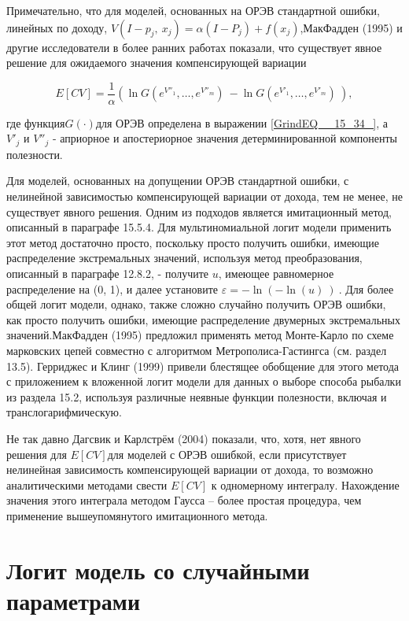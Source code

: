 Примечательно, что для моделей, основанных на ОРЭВ стандартной ошибки, линейных по доходу, $V\left(I-p_j,\ x_j\right)=\alpha \left(I-P_j\right)+f(x_j)$,МакФадден (1995) и другие исследователи в более ранних работах показали, что существует явное решение для ожидаемого значения компенсирующей вариации

\[E\left[CV\right]=\frac{1}{\alpha }\left({\ln  G\left(e^{V''_1},\dots ,e^{V''_m}\right)\ }-{\ln  G\left(e^{V'_1},\dots ,e^{V'_m}\right)\ }\right),\] 

где функция$G(\cdot )$для ОРЭВ определена в выражении \eqref{GrindEQ__15_34_}, а $V'_j$ и $V''_j$ - априорное и апостериорное значения детерминированной компоненты полезности.

Для моделей, основанных на допущении ОРЭВ стандартной ошибки, с нелинейной зависимостью компенсирующей вариации от дохода, тем не менее, не существует явного решения. Одним из подходов является имитационный метод, описанный в параграфе 15.5.4. Для мультиномиальной логит модели применить этот метод достаточно просто, поскольку просто получить ошибки, имеющие распределение экстремальных значений, используя метод преобразования, описанный в параграфе 12.8.2, - получите $u$, имеющее равномерное распределение на (0, 1), и  далее установите $\varepsilon =-{\ln  (-{\ln  (u)\ })\ }$. Для более общей логит модели, однако, также сложно случайно получить ОРЭВ ошибки, как просто получить ошибки, имеющие распределение двумерных экстремальных значений.МакФадден (1995) предложил применять метод Монте-Карло по схеме марковских цепей совместно с алгоритмом Метрополиса-Гастингса (см. раздел 13.5). Герриджес и Клинг (1999) привели блестящее обобщение для этого метода с приложением к вложенной логит модели для данных о выборе способа рыбалки из раздела 15.2, используя различные неявные функции полезности, включая и транслогарифмическую.

Не так давно Дагсвик и Карлстрём (2004) показали, что, хотя, нет явного решения для $E\left[CV\right]$для моделей с ОРЭВ ошибкой, если присутствует нелинейная зависимость компенсирующей вариации от дохода, то возможно аналитическими методами свести $E\left[CV\right]$ к одномерному интегралу. Нахождение значения этого интеграла методом Гаусса -- более простая процедура, чем применение вышеупомянутого имитационного метода.

\section{Логит модель со случайными параметрами}

